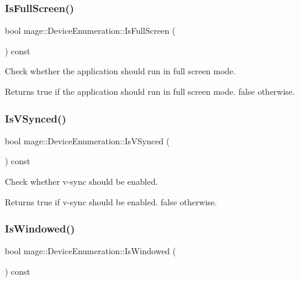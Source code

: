 \subsubsection{\texorpdfstring{Is\+Full\+Screen()}{IsFullScreen()}}
{\footnotesize\ttfamily bool mage\+::\+Device\+Enumeration\+::\+Is\+Full\+Screen (\begin{DoxyParamCaption}{ }\end{DoxyParamCaption}) const}

Check whether the application should run in full screen mode.

\begin{DoxyReturn}{Returns}
{\ttfamily true} if the application should run in full screen mode. {\ttfamily false} otherwise. 
\end{DoxyReturn}
\hypertarget{classmage_1_1_device_enumeration_a035e2430142e4e4ffcbc712f83e1e7e0}{}\label{classmage_1_1_device_enumeration_a035e2430142e4e4ffcbc712f83e1e7e0} 
\subsubsection{\texorpdfstring{Is\+V\+Synced()}{IsVSynced()}}
{\footnotesize\ttfamily bool mage\+::\+Device\+Enumeration\+::\+Is\+V\+Synced (\begin{DoxyParamCaption}{ }\end{DoxyParamCaption}) const}

Check whether v-\/sync should be enabled.

\begin{DoxyReturn}{Returns}
{\ttfamily true} if v-\/sync should be enabled. {\ttfamily false} otherwise. 
\end{DoxyReturn}
\hypertarget{classmage_1_1_device_enumeration_a51479c8c85b286f78730c5622604e524}{}\label{classmage_1_1_device_enumeration_a51479c8c85b286f78730c5622604e524} 
\subsubsection{\texorpdfstring{Is\+Windowed()}{IsWindowed()}}
{\footnotesize\ttfamily bool mage\+::\+Device\+Enumeration\+::\+Is\+Windowed (\begin{DoxyParamCaption}{ }\end{DoxyParamCaption}) const}

